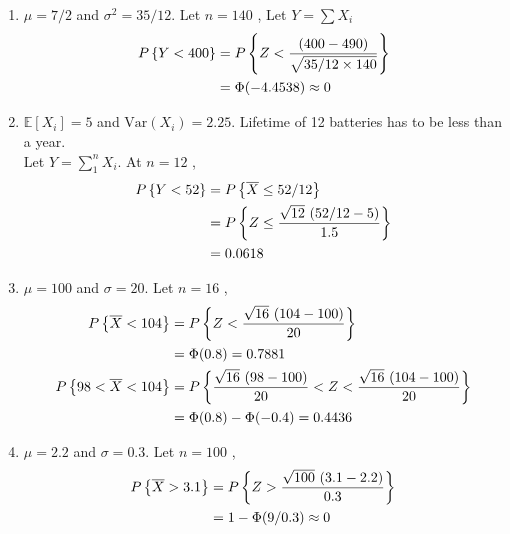 \begin{enumerate}
	\item $ \mu = 7/2 $ and $ \sigma^2 = 35/12 $. Let $ n = 140 $ , Let $ Y = \sum X_i $\\
	\begin{subequations}
		\begin{align}
			P \left\{Y < 400 \right\} &= P \left\{ Z < \frac{(400 - 490)}{\sqrt{35/12 \times 140}} \right\} \nonumber \\
			&= \Phi (-4.4538) \approx 0
		\end{align}\\
	\end{subequations}

	\item $ \mathbb{E}[X_i] = 5 $ and $ \mathrm{Var}(X_i) = 2.25 $. Lifetime of 12 batteries has to be less than a year.\\
	Let $ Y = \sum^n_1 X_i $. At $ n = 12 $ , \\
	\begin{subequations}
		\begin{align}
			P \left\{Y < 52 \right\} &= P \left\{ \overline{X} \leq 52/12 \right\} \nonumber \\
			&= P \left\{ Z \leq \frac{\sqrt{12}\ (52/12 - 5)}{1.5} \right\} \nonumber \\
			&= 0.0618 \nonumber 
		\end{align}\\
	\end{subequations}
	
	\item $ \mu = 100 $ and $ \sigma = 20 $. Let $ n = 16 $ , \\
	\begin{subequations}
		\begin{align}
			P \left\{\overline{X} < 104 \right\} &= P \left\{ Z < \frac{\sqrt{16}\ (104 - 100)}{20} \right\} \nonumber \\
			&= \Phi (0.8) = 0.7881 \\
			P \left\{98 < \overline{X} < 104 \right\} &= P \left\{ \frac{\sqrt{16}\ (98 - 100)}{20} < Z < \frac{\sqrt{16}\ (104 - 100)}{20} \right\} \nonumber \\
			&= \Phi (0.8) - \Phi(-0.4) = 0.4436
		\end{align}\\
	\end{subequations}

	\item $ \mu = 2.2 $ and $ \sigma = 0.3 $. Let $ n = 100 $ , \\
	\begin{subequations}
		\begin{align}
			P \left\{\overline{X} > 3.1 \right\} &= P \left\{ Z > \frac{\sqrt{100}\ (3.1 - 2.2)}{0.3} \right\} \nonumber \\
			&= 1 - \Phi (9/0.3) \approx 0  
		\end{align}\\
	\end{subequations}


\end{enumerate}
